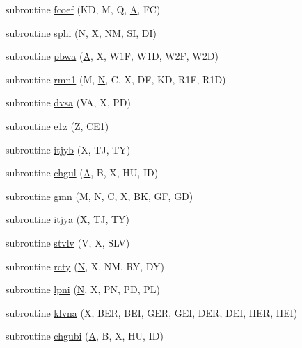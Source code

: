 \begin{DoxyCompactItemize}
\item 
subroutine \hyperlink{specfun_8f_ae015938138dfbce0ae31de54de87e595}{fcoef} (K\+D, M, Q, \hyperlink{classA}{A}, F\+C)
\item 
subroutine \hyperlink{specfun_8f_ac91d0c0cbfa022b459787e02d4936169}{sphi} (\hyperlink{polmisc_8c_a0240ac851181b84ac374872dc5434ee4}{N}, X, N\+M, S\+I, D\+I)
\item 
subroutine \hyperlink{specfun_8f_a89beea205a3db94ace5865ea8302bc59}{pbwa} (\hyperlink{classA}{A}, X, W1\+F, W1\+D, W2\+F, W2\+D)
\item 
subroutine \hyperlink{specfun_8f_a151485cb0a8f16c54261b4f88c788e17}{rmn1} (M, \hyperlink{polmisc_8c_a0240ac851181b84ac374872dc5434ee4}{N}, C, X, D\+F, K\+D, R1\+F, R1\+D)
\item 
subroutine \hyperlink{specfun_8f_aa0aad35320be42be7f7a0a00b86d367a}{dvsa} (V\+A, X, P\+D)
\item 
subroutine \hyperlink{specfun_8f_ae6fb94cbee9448493a8827070bd03dad}{e1z} (Z, C\+E1)
\item 
subroutine \hyperlink{specfun_8f_aac7b6213f7bfd282595b42683f141e08}{itjyb} (X, T\+J, T\+Y)
\item 
subroutine \hyperlink{specfun_8f_aa4f8f2f0e6b2879e66cadd7f7e1a406b}{chgul} (\hyperlink{classA}{A}, B, X, H\+U, I\+D)
\item 
subroutine \hyperlink{specfun_8f_af61cf8ea94fb00581b3986378cd3568c}{gmn} (M, \hyperlink{polmisc_8c_a0240ac851181b84ac374872dc5434ee4}{N}, C, X, B\+K, G\+F, G\+D)
\item 
subroutine \hyperlink{specfun_8f_a9783c7ce9beaa7c2c3c0f9157b391596}{itjya} (X, T\+J, T\+Y)
\item 
subroutine \hyperlink{specfun_8f_a86e933945bfd749ea370a34fbd159df0}{stvlv} (V, X, S\+L\+V)
\item 
subroutine \hyperlink{specfun_8f_a63c04c7fdef520755385ca703cc90717}{rcty} (\hyperlink{polmisc_8c_a0240ac851181b84ac374872dc5434ee4}{N}, X, N\+M, R\+Y, D\+Y)
\item 
subroutine \hyperlink{specfun_8f_ac6c4926aedb45c8e8dc2905fb6fcd7fd}{lpni} (\hyperlink{polmisc_8c_a0240ac851181b84ac374872dc5434ee4}{N}, X, P\+N, P\+D, P\+L)
\item 
subroutine \hyperlink{specfun_8f_ae229a19e09ba56916a027160a7aa55ce}{klvna} (X, B\+E\+R, B\+E\+I, G\+E\+R, G\+E\+I, D\+E\+R, D\+E\+I, H\+E\+R, H\+E\+I)
\item 
subroutine \hyperlink{specfun_8f_a60e34212fd340d4a4f051d6b614eacaf}{chgubi} (\hyperlink{classA}{A}, B, X, H\+U, I\+D)
\item 

\end{DoxyCompactItemize}
